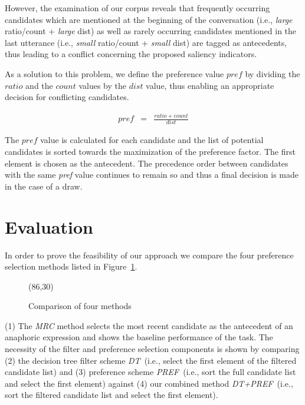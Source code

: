 However, the examination of our corpus reveals that frequently occurring candidates
which are mentioned at the beginning of the conversation (i.e., {\em large} ratio/count + {\em large} dist)
as well as rarely occurring candidates mentioned in the last utterance (i.e., {\em small} ratio/count + {\em small} dist)
are tagged as antecedents, thus leading to a conflict concerning the proposed saliency indicators.

As a solution to this problem, we define the preference value $pref$ by dividing the $ratio$ and the $count$ values
by the $dist$ value, thus enabling an appropriate decision for conflicting candidates.

\begin{eqnarray*}
  pref & = & \frac{ratio + count}{dist}
\end{eqnarray*}

The $pref$ value is calculated for each candidate and the list of
potential candidates is sorted towards the maximization of the preference factor.
The first element is chosen as the antecedent.
The precedence order between candidates with the same {\em pref} value continues to remain so and
thus a final decision is made in the case of a draw.

\section{Evaluation}
\label{eval}

In order to prove the feasibility of our approach we compare the four
preference selection methods listed in Figure~\ref{pic-exp}.

\begin{figure}[htb]
  \vspace*{-1.5\baselineskip}
  \begin{center}
\atari(86,30)
    \vspace*{-0.25\baselineskip}
    \caption{Comparison of four methods}\label{pic-exp}
  \vspace*{-1.5\baselineskip}
  \end{center}
\end{figure}

(1) The {\small\em MRC} method selects the most recent candidate as the antecedent
of an anaphoric expression and shows the baseline performance of the task.
The necessity of the filter and preference selection components
is shown by comparing (2) the decision tree filter scheme {\small\em DT}\, (i.e., select the first
element of the filtered candidate list) and (3) preference scheme {\small\em PREF}\, (i.e., sort
the full candidate list and select the first element) against (4) our combined method 
{\small\em DT+PREF}\, (i.e., sort the filtered candidate list and select the first element).

